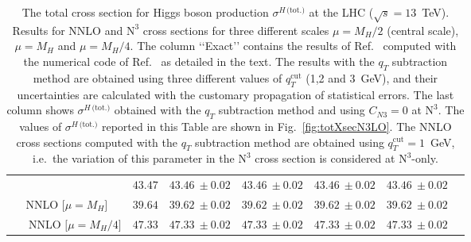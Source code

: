 \documentclass[12pt]{article}
\DeclareRobustCommand{\qt}{\ensuremath{q_T}\xspace}
\DeclareRobustCommand{\qtcut}{\ensuremath{q_T^\mathrm{cut}}\xspace}
\DeclareRobustCommand{\tot}{\text{(tot.)}\xspace}
\DeclareRobustCommand{\LO}{\text{LO}\xspace}
\DeclareRobustCommand{\N}[1]{\ensuremath{\text{N}^{#1}}} %
\begin{document}
\begin{table}
{\begin{tabular}{ |c||c|c|c|c|c|c| }
& $43.47$%

& $43.46~\pm 0.02$

& $43.46~\pm 0.02$

& $43.46~\pm 0.02$ 

& $43.46~\pm 0.02$  \\

\multirow{1}{*}{NNLO  {\scriptsize$\big[\mu=M_{H}\big]$} } 

& $39.64$%

& $39.62~\pm 0.02$ 

& $39.62~\pm 0.02$ 

& $39.62~\pm 0.02$ 

& $39.62~\pm 0.02$ \\

\multirow{1}{*}{~~~NNLO  {\scriptsize$\big[\mu=M_{H}/4\big]$} } 

& $47.33$%

& $47.33~\pm 0.02$  

& $47.33~\pm 0.02$

& $47.33~\pm 0.02$  

& $47.33~\pm 0.02$ \\

\hline

\end{tabular}
}
\caption{\label{Table:totXsec}
{The total cross section for Higgs boson production $\sigma^{H\,\tot}$ at the LHC ($\sqrt{s}=13$~TeV). Results for NNLO and \N3\LO cross sections for three different scales $\mu=M_{H}/2$ (central scale), $\mu=M_{H}$ and $\mu=M_{H}/4$. The column \lq{}\lq{}Exact\rq{}\rq{} contains the results of Ref.~\cite{Mistlberger:2018etf} computed with the numerical code of Ref.~\cite{Dulat:2018rbf} as detailed in the text. The results with the $\qt$ subtraction method are obtained using three different values of $\qtcut$ (1,2 and 3~GeV), and their uncertainties are calculated with the customary propagation of statistical errors. The last column shows $ \sigma^{H\,\tot}$ obtained with the $\qt$ subtraction method and using $C_{N3}=0$ at \N3\LO. The values of $ \sigma^{H\,\tot}$ reported in this Table are shown in Fig.~\ref{fig:totXsecN3LO}. The NNLO cross sections computed with the $\qt$ subtraction method are obtained using $\qtcut=1$~GeV, i.e.\ the variation of this parameter in the \N3\LO cross section is considered at \N3\LO-only.
}
}
\renewcommand{\arraystretch}{1}
\end{table}
\end{document}

